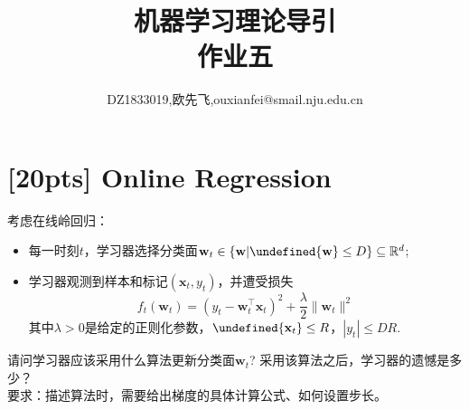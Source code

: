\documentclass[a4paper,UTF8]{article}
\let\norm\undefined %
\DeclarePairedDelimiter\norm{\lVert}{\rVert}
\numberwithin{equation}{section}
\begin{document}
\renewcommand{\tilde}{\mathbf{w}idetilde}
\renewcommand{\hat}{\mathbf{w}idehat}

	\title{机器学习理论导引\\
		作业五}
	\author{DZ1833019,欧先飞,ouxianfei@smail.nju.edu.cn}
	\maketitle
	
	

\section{[20pts] Online Regression}
\noindent [在线回归]考虑在线岭回归：
\begin{itemize}
  \item 每一时刻$t$，学习器选择分类面$\mathbf{w}_t \in \{\mathbf{w}| \norm{\mathbf{w}} \leq D\} \subseteq \mathbb{R}^d$;
  \item 学习器观测到样本和标记$(\mathbf{x}_t,y_t)$，并遭受损失
  \[
  f_t(\mathbf{w}_t)=(y_t -\mathbf{w}_t^\top \mathbf{x}_t)^2 + \frac{\lambda}{2} \|\mathbf{w}_t\|^2
  \]
其中$\lambda>0$是给定的正则化参数，$\norm{\mathbf{x}_t} \leq R$，$|y_t| \leq DR$.
\end{itemize}
请问学习器应该采用什么算法更新分类面$\mathbf{w}_t$? 采用该算法之后，学习器的遗憾是多少？\\
要求：描述算法时，需要给出梯度的具体计算公式、如何设置步长。
\end{document}
